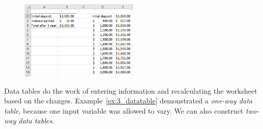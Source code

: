 \begin{myexample}
\begin{figure}[htbp]
	\centering
	\includegraphics[width=0.5\textwidth]{fig/3_datatable_3.png}
	\label{fig:3_datatable_3}
\end{figure}

\end{myexample}

Data tables do the work of entering information and recalculating the worksheet based on the changes.
Example~\ref{ex:3_datatable} demonstrated a \emph{one-way data table}, because one input variable was allowed to vary.
We can also construct \emph{two-way data tables}.

